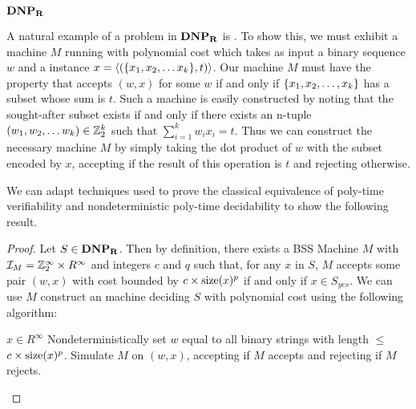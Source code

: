 {\begin{definition}{\textbf{$\mathbf{DNP_R}$}}
\end{definition}

\begin{example}

  A natural example of a problem in $\mathbf{DNP_R}$ is \subsum.  To show this,
  we must exhibit a machine $M$ running with polynomial cost which
  takes as input a binary sequence $w$ and a \subsum instance $x =
  \langle (\{x_1, x_2, \ldots x_k\}, t) \rangle$.  Our machine $M$
  must have the property that accepts $(w,x)$ for some $w$ if and only
  if $\{x_1, x_2, \ldots, x_k\}$ has a subset whose sum is $t$.
  Such a machine is easily constructed by noting that the sought-after
  subset exists if and only if there exists an n-tuple $(w_1, w_2,
  \ldots w_k) \in \mathbb{Z}_2^k$ such that $\sum\limits_{i=1}^k w_ix_i
  = t$.  Thus we can construct the necessary machine $M$ by simply
  taking the dot product of $w$ with the subset encoded by $x$,
  accepting if the result of this operation is $t$ and rejecting
  otherwise.
  
\end{example}

We can adapt techniques used to prove the classical equivalence of
poly-time verifiability and nondeterministic poly-time decidability to
show the following result.

\theorem{$\dnp = \ndetp$}

\begin{proof}

  Let $S \in \mathbf{DNP_R}$.  Then by definition, there exists a BSS Machine
  $M$ with $\mathcal{I}_M = \mathbb{Z}_2^\infty \times R^\infty$ and
  integers $c$ and $q$ such that, for any $x$ in $S$, $M$ accepts some
  pair $(w,x)$ with cost bounded by $c \times \text{size}(x)^p$ if and only
  if $x \in S_{yes}$.  We can use $M$ construct an \ndet machine
  deciding $S$ with polynomial cost using the following algorithm:

  \begin{algorithm}
    \caption{$\dnp \rightarrow \ndetp$} \label{alg:dnp->ndet}
    \begin{algorithmic}
      \Require $x \in R^\infty$ 
      \State Nondeterministically set $w$
      equal to all binary strings with length $\leq$ $c \times
      \text{size}(x)^p$.
      \State Simulate $M$ on $(w,x)$, accepting if $M$ accepts and rejecting if $M$ rejects.
    \end{algorithmic}
  \end{algorithm}
\end{proof}

}
